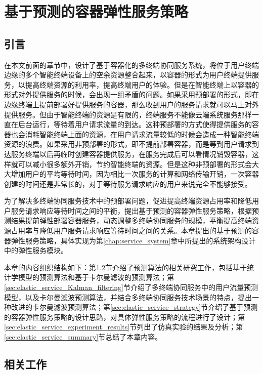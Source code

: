 \chapter{基于预测的容器弹性服务策略 }\label{chap:elastic_service}

\section{引言}

在本文前面的章节中，设计了基于容器化的多终端协同服务系统，将位于用户终端边缘的多个智能终端设备上的空余资源整合起来，以容器的形式为用户终端提供服务，以提高终端资源的利用率，提高终端用户的体验。但是在智能终端上以容器的形式对外提供服务的时候，会出现一组矛盾的问题。如果采用预部署的形式，即在边缘终端上提前部署好提供服务的容器，那么收到用户的服务请求就可以马上对外提供服务。但由于智能终端的资源是有限的，终端服务不能像云端系统服务那样一直在后台运行，等待着用户请求流量的到达。这种预部署的方式使得提供服务的容器也会消耗智能终端上面的资源，在用户请求流量较低的时候会造成一种智能终端资源的浪费。如果采用非预部署的形式，即不提前部署容器，而是等到用户请求到达服务终端以后再临时创建容器提供服务，在服务完成后可以看情况销毁容器，这样就可以减小很多额外开销，节约智能终端的资源。但是这种非预部署的形式会大大增加用户的平均等待时间，因为相比一次服务的计算和网络传输开销，一次容器创建的时间还是非常长的，对于等待服务请求响应的用户来说完全不能够接受。

为了解决多终端协同服务技术中的预部署问题，促进提高终端资源占用率和降低用户服务请求响应等待时间之间的平衡，提出基于预测的容器弹性服务策略，根据预测结果提前弹性部署容器服务，动态调整多终端协同服务的规模，平衡提高终端资源占用率与降低用户服务请求响应等待时间之间的关系。本章提出的基于预测的容器弹性服务策略，具体实现为第\ref{chap:service_system}章中所提出的系统架构设计中的弹性服务模块。

本章的内容组织结构如下：第\ref{sec:elastic_service_related_work}节介绍了预测算法的相关研究工作，包括基于统计学模型的预测算法和基于卡尔曼滤波的预测算法；第\ref{sec:elastic_service_Kalman_filtering}节介绍了多终端协同服务中的用户流量预测模型，以及卡尔曼滤波预测算法，并结合多终端协同服务技术场景的特点，提出一种改进的卡尔曼滤波预测算法；第\ref{sec:elastic_service_strategy}节介绍了基于预测的容器弹性服务策略的设计思路，对具体弹性服务策略的流程进行了设计；第\ref{sec:elastic_service_experiment_results}节列出了仿真实验的结果及分析；第\ref{sec:elastic_service_summary}节总结了本章内容。

\section{相关工作}\label{sec:elastic_service_related_work}

